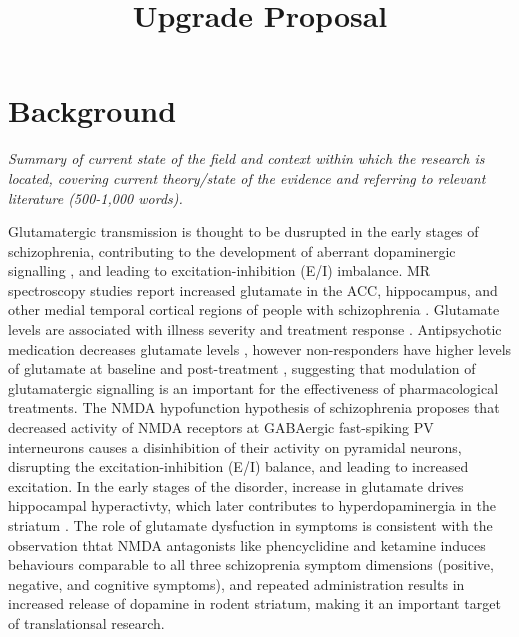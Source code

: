 \documentclass[
  letterpaper,
  DIV=11,
  numbers=noendperiod]{scrartcl}
\title{Upgrade Proposal}
\author{Julia Marcinkowska \and  \and }
\date{}
\begin{document}
\maketitle

\section{Background}\label{background}

\emph{Summary of current state of the field and context within which the
research is located, covering current theory/state of the evidence and
referring to relevant literature (500-1,000 words).}

Glutamatergic transmission is thought to be dusrupted in the early
stages of schizophrenia, contributing to the development of aberrant
dopaminergic signalling
\autocite{grace_dopamine_2012,grace_dysregulation_2016}, and leading to
excitation-inhibition (E/I) imbalance. MR spectroscopy studies report
increased glutamate in the ACC, hippocampus, and other medial temporal
cortical regions of people with schizophrenia
\autocite{merritt_nature_2017,kraguljac_increased_2013,marsman_glutamate_2013,nakahara_glutamatergic_2022}.
Glutamate levels are associated with illness severity and treatment
response \autocite{merritt_nature_2017}. Antipsychotic medication
decreases glutamate levels
\autocite{bojesen_treatment_2020,jeon_progressive_2021,egerton_effects_2017},
however non-responders have higher levels of glutamate at baseline
\autocite{fan_glutamatergic_2024,reyes-madrigal_striatal_2022} and
post-treatment \autocite{reyes-madrigal_striatal_2022}, suggesting that
modulation of glutamatergic signalling is an important for the
effectiveness of pharmacological treatments. The NMDA hypofunction
hypothesis of schizophrenia proposes that decreased activity of NMDA
receptors at GABAergic fast-spiking PV
interneurons\autocite{nakazawa_spatial_2017} causes a disinhibition of
their activity on pyramidal neurons, disrupting the
excitation-inhibition (E/I) balance, and leading to increased
excitation. In the early stages of the disorder, increase in glutamate
drives hippocampal hyperactivty, which later contributes to
hyperdopaminergia in the striatum
\autocite{grace_dopamine_2012,grace_dysregulation_2016,balla_continuous_2001}.
The role of glutamate dysfuction in symptoms is consistent with the
observation thtat NMDA antagonists like phencyclidine and ketamine
induces behaviours comparable to all three schizoprenia symptom
dimensions (positive, negative, and cognitive
symptoms)\autocite{beck_association_2020}, and repeated administration
results in increased release of dopamine in rodent
striatum\autocite{balla_continuous_2001}, making it an important target
of translationsal research.
\end{document}
